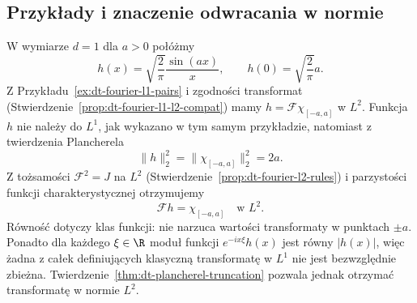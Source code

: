 \subsection{Przykłady i znaczenie odwracania w normie}

\begin{przyklad}
\label{ex:dt-fourier-l2-sinc}
W wymiarze $d=1$ dla $a>0$ połóżmy
\[
 h(x)=\sqrt{\frac{2}{\pi}}\frac{\sin(ax)}{x},
 \qquad h(0)=\sqrt{\frac{2}{\pi}}a.
\]
Z Przykładu~\ref{ex:dt-fourier-l1-pairs} i zgodności
transformat (Stwierdzenie~\ref{prop:dt-fourier-l1-l2-compat}) mamy $h=\mathcal F\chi_{[-a,a]}$ w $L^2$.
Funkcja $h$ nie należy do $L^1$, jak wykazano
w tym samym przykładzie, natomiast z twierdzenia
Plancherela
\[
 \|h\|_2^2=\|\chi_{[-a,a]}\|_2^2=2a.
\]
Z tożsamości $\mathcal F^2=J$ na $L^2$
(Stwierdzenie~\ref{prop:dt-fourier-l2-rules}) i parzystości
funkcji charakterystycznej otrzymujemy
\[
 \mathcal F h=\chi_{[-a,a]}\quad\text{w }L^2.
\]
Równość dotyczy klas funkcji: nie narzuca wartości
transformaty w punktach $\pm a$. Ponadto dla każdego
$\xi\in\R$ moduł funkcji $e^{-ix\xi}h(x)$ jest równy
$|h(x)|$, więc żadna z całek definiujących klasyczną
transformatę w $L^1$ nie jest bezwzględnie zbieżna.
Twierdzenie~\ref{thm:dt-plancherel-truncation}
pozwala jednak otrzymać transformatę w normie $L^2$.
\end{przyklad}
